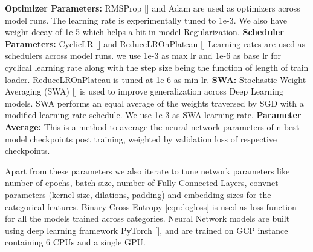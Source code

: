 {\bf Optimizer Parameters:} RMSProp [\cite{bengio2015rmsprop}] and Adam are used as optimizers across model runs. 
The learning rate is experimentally tuned to 1e-3. We also have weight decay of 1e-5 which helps a bit in model Regularization.
{\bf Scheduler Parameters:} CyclicLR [\cite{smith2017cyclical}] and ReduceLROnPlateau [\cite{zaheer2018adaptive}] 
Learning rates are used as schedulers across model runs.
we use 1e-3 as max lr and 1e-6 as base lr for cyclical learning rate along with the step size being the function of
length of train loader. ReduceLROnPlateau is tuned at 1e-6 as min lr.
{\bf SWA:} Stochastic Weight Averaging (SWA) [\cite{izmailov2018averaging}] is used to improve generalization 
across Deep Learning models. SWA performs an equal average of the weights traversed by SGD with a modified 
learning rate schedule. We use 1e-3 as SWA learning rate.
{\bf Parameter Average:} This is a method to average the neural network parameters of n best model checkpoints 
post training, weighted by validation loss of respective checkpoints.

Apart from these parameters we also iterate to tune network parameters like number of epochs, batch size, 
number of Fully Connected Layers, convnet parameters (kernel size, dilations, padding)
and embedding sizes for the categorical features. Binary Cross-Entropy \ref{eqn:logloss} is used as loss 
function for all the models trained across categories. Neural Network models are built using deep learning framework
PyTorch [\cite{paszke2017automatic}], and are trained on GCP instance containing 6 CPUs and a single GPU. 

